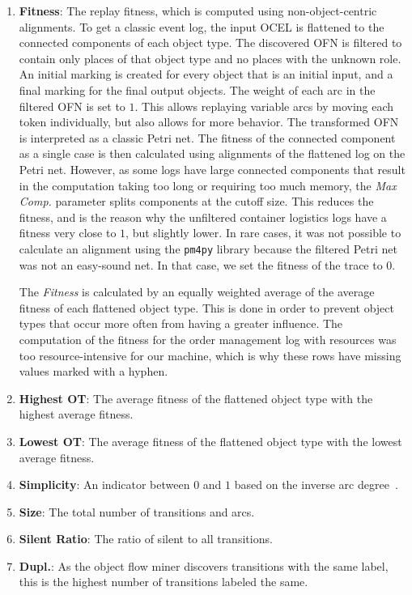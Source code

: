 \begin{enumerate}[start=6]
    \item 
    \textbf{Fitness}: The replay fitness, which is computed using non-object-centric alignments.
To get a classic event log, the input OCEL is flattened to the connected components of each object type.
The discovered OFN is filtered to contain only places of that object type and no places with the unknown role.
An initial marking is created for every object that is an initial input, and a final marking for the final output objects.
The weight of each arc in the filtered OFN is set to $1$.
This allows replaying variable arcs by moving each token individually, but also allows for more behavior.
The transformed OFN is interpreted as a classic Petri net.
The fitness of the connected component as a single case is then calculated using alignments of the flattened log on the Petri net.
However, as some logs have large connected components that result in the computation taking too long or requiring too much memory, the \emph{Max Comp.} parameter splits components at the cutoff size.
This reduces the fitness, and is the reason why the unfiltered container logistics logs have a fitness very close to $1$, but slightly lower.
In rare cases, it was not possible to calculate an alignment using the \texttt{pm4py} library because the filtered Petri net was not an easy-sound net.
In that case, we set the fitness of the trace to $0$.

The \emph{Fitness} is calculated by an equally weighted average of the average fitness of each flattened object type.
This is done in order to prevent object types that occur more often from having a greater influence.
The computation of the fitness for the order management log with resources was too resource-intensive for our machine, which is why these rows have missing values marked with a hyphen.


    \item 
    \textbf{Highest OT}: The average fitness of the flattened object type with the highest average fitness.

    \item 
    \textbf{Lowest OT}: The average fitness of the flattened object type with the lowest average fitness.
    
    \item 
    \textbf{Simplicity}: An indicator between $0$ and $1$ based on the inverse arc degree~\autocite{blum2015metrics}.

    \item 
    \textbf{Size}: The total number of transitions and arcs.

    \item 
    \textbf{Silent Ratio}: The ratio of silent to all transitions.

    \item 
    \textbf{Dupl.}: As the object flow miner discovers transitions with the same label, this is the highest number of transitions labeled the same.
\end{enumerate}




